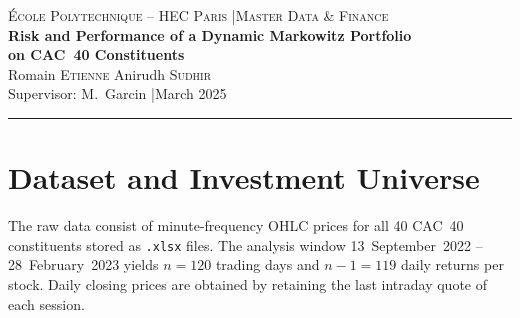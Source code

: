 \documentclass[10pt, a4paper]{article}
\begin{document}
\begin{center}
  {\small \scshape \'Ecole Polytechnique -- HEC Paris \quad|\quad Master Data \& Finance}\\[0.4em]
  {\LARGE\bfseries Risk and Performance of a Dynamic Markowitz Portfolio\\[0.2em]
   on CAC~40 Constituents}\\[0.6em]
  {\normalsize
    Romain \textsc{Etienne} \quad\textbullet\quad Anirudh \textsc{Sudhir}\\[0.2em]
    Supervisor: M.~Garcin \quad|\quad March 2025}
\end{center}
\rule{\linewidth}{0.5pt}

\pagestyle{fancy}
\fancyhf{}
\fancyfoot[C]{\thepage}
\renewcommand{\headrulewidth}{0.4pt}

\begin{abstract}
\noindent
We construct and evaluate a daily-rebalanced Markowitz portfolio on ten diversified
CAC~40 constituents using one-minute OHLC data (September~2022 -- February~2023,
$n=120$ trading days). Expected returns are proxied by AR(1) forecasts built from
lag-1 autocorrelations $\hat\rho_j \in [-0.168, 0.123]$. The unconstrained optimisation
produces extreme leverage ($\sum|\Omega_j| \approx 22$) that destroys capital: the
portfolio ends at $-1271.82$ (base~100) versus $+122.89$ for the equal-weight benchmark.
Ex-ante Sharpe is $0.96$ (annualised) vs.\ ex-post $0.44$; UPR~$= 0.32$; maximum
drawdown~$= -467\%$. The exercise illustrates the dangers of combining unconstrained
Markowitz with weak forecasts and full-sample covariance estimation.
\end{abstract}

\section{Dataset and Investment Universe}

The raw data consist of minute-frequency OHLC prices for all 40 CAC~40 constituents
stored as \texttt{.xlsx} files. The analysis window 13~September~2022 -- 28~February~2023
yields $n = 120$ trading days and $n-1 = 119$ daily returns per stock.
Daily closing prices are obtained by retaining the last intraday quote of each session.
\end{document}
